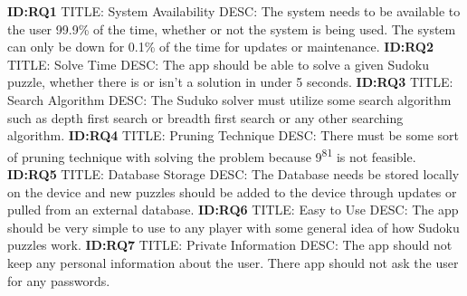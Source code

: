 \documentclass{article}
\begin{document}
\textbf{ID:RQ1} \newline TITLE: System Availability \newline DESC: The system needs to  be available to the user 99.9\% of the time, whether or not the system is being used. The system can only be down for 0.1\% of the time for updates or maintenance. \newline \newline
\textbf{ID:RQ2} \newline TITLE: Solve Time \newline DESC: The app should be able to solve a given Sudoku puzzle, whether there is or isn't a solution in under 5 seconds.\newline \newline
\textbf{ID:RQ3} \newline TITLE: Search Algorithm \newline DESC: The Suduko solver must utilize some search algorithm such as depth first search or breadth first search or any other searching algorithm. \newline \newline
\textbf{ID:RQ4} \newline TITLE: Pruning Technique \newline DESC: There must be some sort of pruning technique with solving the problem because 9\textsuperscript{81} is not feasible. \newline \newline
\textbf{ID:RQ5} \newline TITLE: Database Storage \newline DESC: The Database needs be stored locally on the device and new puzzles should be added to the device through updates or pulled from an external database. \newline \newline
\textbf{ID:RQ6} \newline TITLE: Easy to Use \newline DESC: The app should be very simple to use to any player with some general idea of how Sudoku puzzles work. \newline \newline
\textbf{ID:RQ7} \newline TITLE: Private Information \newline DESC: The app should not keep any personal information about the user. There app should not ask the user for any passwords. \newline \newline
\end{document}

